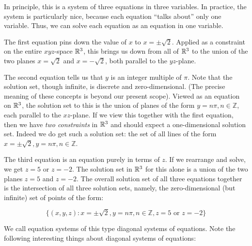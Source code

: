 \documentclass[10pt]{amsart}
\begin{document}
In principle, this is a system of three equations in three
variables. In practice, the system is particularly nice, because each
equation ``talks about'' only one variable. Thus, we can solve each
equation as an equation in one variable.

The first equation pins down the value of $x$ to $x = \pm
\sqrt{2}$. Applied as a constraint on the entire $xyz$-space $\mathbb{R}^3$,
this brings us down from all of $\mathbb{R}^3$ to the union of the two planes
$x = \sqrt{2}$ and $x = -\sqrt{2}$, both parallel to the $yz$-plane.

The second equation tells us that $y$ is an integer multiple of
$\pi$. Note that the solution set, though infinite, is discrete and
zero-dimensional. (The precise meaning of these concepts is beyond our
present scope). Viewed as an equation on $\mathbb{R}^3$, the solution set to
this is the union of planes of the form $y = n\pi, n \in \mathbb{Z}$,
each parallel to the $xz$-plane. If we view this together with the
first equation, then we have {\em two constraints} in $\mathbb{R}^3$ and
should expect a one-dimensional solution set. Indeed we do get such a
solution set: the set of all lines of the form $x = \pm \sqrt{2}, y =
n\pi, n \in \mathbb{Z}$.

The third equation is an equation purely in terms of $z$. If we
rearrange and solve, we get $z = 5$ or $z = -2$. The solution set in
$\mathbb{R}^3$ for this alone is a union of the two planes $z = 5$ and $z =
-2$. The overall solution set of all three equations together is the
intersection of all three solution sets, namely, the zero-dimensional
(but infinite) set of points of the form:

$$\{ (x,y,z) : x = \pm \sqrt{2}, y = n\pi, n \in \mathbb{Z}, z = 5 \text{ or } z = -2 \}$$

We call equation systems of this type diagonal systems of
equations. Note the following interesting things about diagonal
systems of equations:
\end{document}
